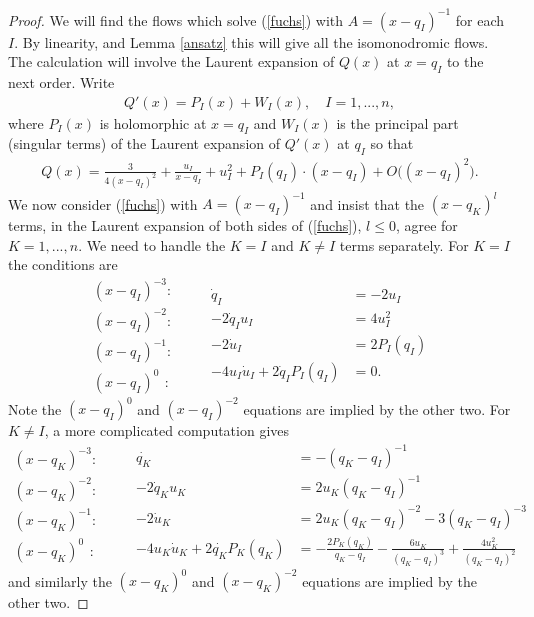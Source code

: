 \documentclass[a4paper,12pt,reqno]{amsart}
\numberwithin{equation}{section}
\numberwithin{counter2}{section}
\begin{document}
\begin{proof}
We will find the flows which solve (\ref{fuchs}) with $A = (x-q_I)^{-1}$ for each $I$.  By linearity,  and Lemma \ref{ansatz} this will give all the isomonodromic flows.  The calculation will involve the Laurent expansion of $Q(x)$ at $x = q_I$ to the next order.  Write
\begin{align}
Q'(x) = P_I(x) + W_I(x),  \quad I = 1,...,n,  
\end{align}
where $P_I(x)$ is holomorphic at $x = q_I$ and $W_I(x)$ is the principal part (singular terms) of the Laurent expansion of $Q'(x)$ at $q_I$ so that
\begin{align}
Q(x) = \frac{3}{4(x-q_I)^2} + \frac{u_I}{x-q_I} + u_I^2 + P_I(q_I)\cdot(x-q_I)+ O\big((x-q_I)^2\big).  
\end{align}
We now consider (\ref{fuchs}) with $A = (x-q_I)^{-1}$ and insist that the $(x-q_K)^{l}$ terms,  in the Laurent expansion of both sides of (\ref{fuchs}),  $l \le 0$,  agree for $K = 1,...,n$.  We need to handle the $K = I$ and $K \ne I$ terms separately.  For $K = I$ the conditions are
\begin{equation}
\begin{aligned}
(x-q_I)^{-3}:& \\
(x-q_I)^{-2}:& \\
(x-q_I)^{-1}:& \\
(x-q_I)^{0}\ \, :& 
\end{aligned}
\ \ \ \ \ 
\begin{aligned}
\dot{q}_I &= -2u_I \\
-2\dot{q}_I u_I &= 4u_I^2 \\ 
-2\dot{u}_I &= 2P_I(q_I) \\
-4u_I\dot{u}_I +  2\dot{q}_IP_I(q_I) &= 0.
\end{aligned}
\end{equation}
Note the $(x-q_I)^0$ and $(x-q_I)^{-2}$ equations are implied by the other two.   For $K \ne I$,  a more complicated computation gives
\begin{equation}
\begin{aligned}
(x-q_K)^{-3}:& \\
(x-q_K)^{-2}:& \\
(x-q_K)^{-1}:& \\
(x-q_K)^{0}\ \, :& 
\end{aligned}
\ \ \ \ \ 
\begin{aligned}
\dot{q_K} &= -(q_K-q_I)^{-1} \\
-2\dot{q}_K u_K &= 2u_K(q_K-q_I)^{-1} \\ 
-2\dot{u}_K &= 2u_K(q_K-q_I)^{-2} - 3(q_K-q_I)^{-3} \\
-4u_K\dot{u}_K +  2\dot{q_K}P_K(q_K) &= -\frac{2P_K(q_K)}{q_K-q_I} -\frac{6u_K}{(q_K-q_I)^3} + \frac{4u_K^2}{(q_K-q_I)^{2}}
\end{aligned}
\end{equation}
and similarly the $(x-q_K)^0$ and $(x-q_K)^{-2}$ equations are implied by the other two. \par 


\end{proof}
\end{document}
